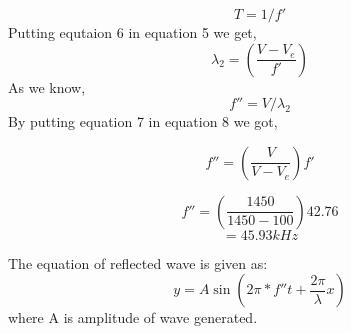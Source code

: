 \documentclass[journal,12pt,twocolumn]{IEEEtran}
\theoremstyle{remark}
\begin{document}
\begin{equation}
T=1/f'
\end{equation}
Putting equtaion 6 in equation 5 we get,
\begin{equation}
\lambda_2=(\frac{V-V_e}{f'})
\end{equation}
As we know,
\begin{equation}
f''=V/\lambda_2
\end{equation}
By putting equation 7 in equation 8 we got,

\begin{equation}
f''=(\frac{V}{V-V_e})f'
\end{equation}

$$f''=(\frac{1450}{1450-100})42.76$$
$$=45.93kHz$$

The equation of reflected wave is given as:
\begin{equation}
y=A\sin(2\pi*f''t+\frac{2\pi}{\lambda}x)
\end{equation}
where A is amplitude of wave generated.
\end{document}
